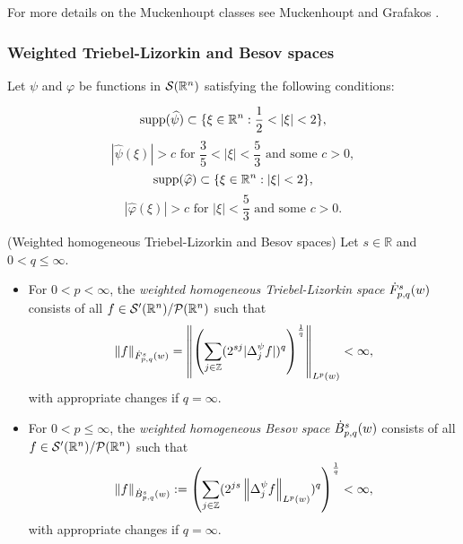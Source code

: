 For more details on the Muckenhoupt classes see Muckenhoupt \cite{MR0293384} and Grafakos \cite{MR3243741}.

\subsubsection{Weighted Triebel-Lizorkin and Besov spaces}\label{TL_B_section}
Let $\psi$ and $\varphi$ be functions in $\sw$ satisfying the following conditions:

\begin{equation}\label{TL_B_psi1}
\text{supp}(\widehat{\psi})\subset\{\xi\in\rn : \frac{1}{2} < |\xi| <2\},
\end{equation} 
\begin{equation}\label{TL_B_psi2}
|\widehat{\psi}(\xi)|>c \text{ for } \frac{3}{5} < |\xi| < \frac{5}{3} \text{ and some } c>0,
\end{equation}
\begin{equation}\label{TL_B_phi1}
\text{supp}(\widehat{\varphi}) \subset \{\xi\in\rn : |\xi| < 2\},
\end{equation}
\begin{equation}\label{TL_B_phi2}
|\widehat{\varphi}(\xi)|>c \text{ for } |\xi| < \frac{5}{3} \text{ and some } c>0. 
\end{equation}



\begin{dfn}{(Weighted homogeneous Triebel-Lizorkin and Besov spaces)}\label{TL_B_def}
Let $s\in\mathbb{R}$ and $0<q\leq\infty$.
\begin{itemize}
\item For $0<p<\infty$, the \textit{weighted homogeneous Triebel-Lizorkin space} $\tlw{p}{s}{q}{w}$ consists of all $f\in \swp/\mathcal{P}(\rn)$ such that 
\begin{equation*}
\norm{f}{\tlw{p}{s}{q}{w}}=\norm{\left(\sum_{j\in\ent}(2^{sj}|\Delta^\psi_jf|)^q\right)^{\frac{1}{q}}}{\lebw{p}{w}}<\infty,
\end{equation*}
with appropriate changes if $q=\infty$. 
\item For $0<p\leq\infty$, the \textit{weighted homogeneous Besov space} $\besw{p}{s}{q}{w}$ consists of all $f\in \swp/\mathcal{P}(\rn)$ such that 
\begin{equation*}
\norm{f}{\besw{p}{s}{q}{w}} := \left(\sum_{j\in\ent} (2^{js}\norm{\Delta^\psi_jf}{L^p(w)})^q\right)^{\frac{1}{q}} < \infty,
\end{equation*}
with appropriate changes if $q=\infty$. 
\end{itemize}
\end{dfn}

